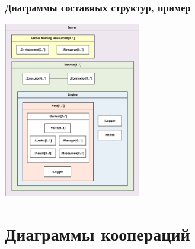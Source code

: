 \documentclass{../../slides-style}
\begin{document}
    \begin{frame}
        \frametitle{Диаграммы составных структур, пример}
        \begin{center}
            \includegraphics[width=0.45\textwidth]{compositeStructureExample.png}
        \end{center}
    \end{frame}

    \section{Диаграммы коопераций}
\end{document}
